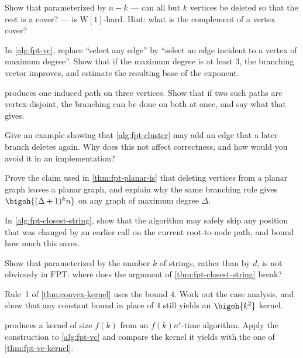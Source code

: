 \begin{exercise}
Show that  parameterized by $n - k$ --- can all but $k$
vertices be deleted so that the rest is a cover? --- is
$\mathrm{W}[1]$-hard. Hint: what is the complement of a vertex cover?
\end{exercise}

\begin{exercise}
In \cref{alg:fpt-vc}, replace ``select any edge'' by ``select an edge incident
to a vertex of maximum degree''. Show that if the maximum degree is at least
$3$, the branching vector improves, and estimate the resulting base of the
exponent.
\end{exercise}

\begin{exercise}
 produces one induced path on three vertices. Show that if
two such paths are vertex-disjoint, the branching can be done on both at once,
and say what that gives.
\end{exercise}

\begin{exercise}
Give an example showing that \cref{alg:fpt-cluster} may add an edge that a later
branch deletes again. Why does this not affect correctness, and how would you
avoid it in an implementation?
\end{exercise}

\begin{exercise}
Prove the claim used in \cref{thm:fpt-planar-is} that deleting vertices from a
planar graph leaves a planar graph, and explain why the same branching rule
gives $\bigoh{(\Delta+1)^k n}$ on any graph of maximum degree $\Delta$.
\end{exercise}

\begin{exercise}
In \cref{alg:fpt-closest-string}, show that the algorithm may safely skip any
position that was changed by an earlier call on the current root-to-node path,
and bound how much this saves.
\end{exercise}

\begin{exercise}
Show that  parameterized by the number $k$ of strings,
rather than by $d$, is not obviously in $\mathrm{FPT}$: where does the argument
of \cref{thm:fpt-closest-string} break?
\end{exercise}

\begin{exercise}
Rule~1 of \cref{thm:convex-kernel} uses the bound $4$. Work out the case
analysis, and show that any constant bound in place of $4$ still yields an
$\bigoh{k^2}$ kernel.
\end{exercise}

\begin{exercise}
 produces a kernel of size $f(k)$ from an
$f(k)n^c$-time algorithm. Apply the construction to \cref{alg:fpt-vc} and
compare the kernel it yields with the one of \cref{thm:fpt-vc-kernel}.
\end{exercise}
